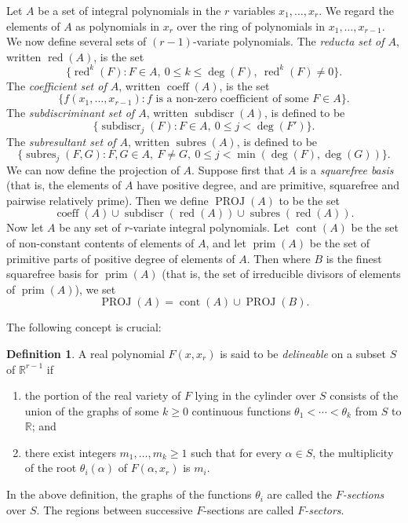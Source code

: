 \documentclass[11pt]{article}
\theoremstyle{plain}
\theoremstyle{definition}
\newtheorem*{definition}{Definition}
\newcommand{\R}{\mathbb{R}}
\DeclareMathOperator{\subres}{subres}
\DeclareMathOperator{\subdiscr}{subdiscr}
\DeclareMathOperator{\coeff}{coeff}
\DeclareMathOperator{\cont}{cont}
\DeclareMathOperator{\prm}{prim}
\DeclareMathOperator{\red}{red}
\DeclareMathOperator{\PROJ}{PROJ}
\begin{document}
Let $A$ be a set of integral polynomials in the $r$ variables
$x_1, \ldots, x_r$. We regard the elements of $A$ as polynomials in
$x_r$ over the ring of polynomials in $x_1, \ldots, x_{r-1}$. We now
define several sets of $(r-1)$-variate polynomials. The \emph{reducta
set of $A$}, written $\red(A)$, is the set
\[
\{ \red^k(F) : F \in A,\ 0 \le k \le \deg(F),\ \red^k(F) \ne 0 \}.
\]
The \emph{coefficient set of $A$}, written $\coeff(A)$, is the set
\[
\{ f(x_1, \ldots, x_{r-1}) : f \text{ is a non-zero coefficient of some }
F \in A \}.
\]
The \emph{subdiscriminant set of $A$}, written $\subdiscr(A)$, is
defined to be
\[
\{ \subdiscr_j(F) : F \in A,\ 0 \le j < \deg(F') \}.
\]
The \emph{subresultant set of $A$}, written $\subres(A)$, is defined to
be
\[
\{ \subres_j(F, G) : F, G \in A,\ F \ne G,\
0 \le j < \min(\deg(F), \deg(G)) \}.
\]
We can now define the projection of $A$. Suppose first that $A$ is a
\emph{squarefree basis} (that is, the elements of $A$ have positive
degree, and are primitive, squarefree and pairwise relatively prime).
Then we define $\PROJ(A)$ to be the set
\[
\coeff(A) \cup \subdiscr(\red(A)) \cup \subres(\red(A)).
\]
Now let $A$ be any set of $r$-variate integral polynomials. Let
$\cont(A)$ be the set of non-constant contents of elements of $A$, and
let $\prm(A)$ be the set of primitive parts of positive degree of
elements of $A$. Then where $B$ is the finest squarefree basis for
$\prm(A)$ (that is, the set of irreducible divisors of elements of
$\prm(A)$), we set
\[
\PROJ(A) = \cont(A) \cup \PROJ(B).
\]

The following concept is crucial:

\begin{definition}
A real polynomial $F(x, x_r)$ is said to be \emph{delineable} on a
subset $S$ of $\R^{r-1}$ if
\begin{enumerate}
\item[(1)] the portion of the real variety of $F$ lying in the cylinder
over $S$ consists of the union of the graphs of some $k \ge 0$
continuous functions $\theta_1 < \cdots < \theta_k$ from $S$ to $\R$;
and
\item[(2)] there exist integers $m_1, \ldots, m_k \ge 1$ such that for
every $\alpha \in S$, the multiplicity of the root $\theta_i(\alpha)$
of $F(\alpha, x_r)$ is $m_i$.
\end{enumerate}
\end{definition}

In the above definition, the graphs of the functions $\theta_i$ are
called the \emph{$F$-sections} over $S$. The regions between successive
$F$-sections are called \emph{$F$-sectors}.
\end{document}
